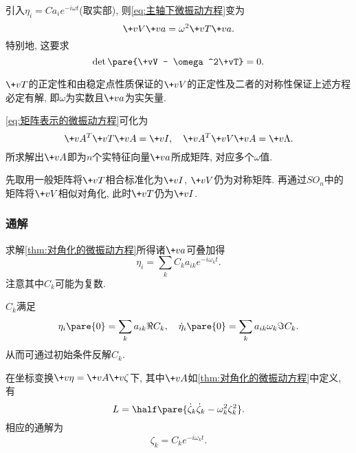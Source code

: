 \documentclass[../TheoreticalMechanics.tex]{subfiles}
\begin{document}
\begin{theorem}[矩阵表示的微振动方程]
    引入$\eta_i = Ca_ie^{-i\omega t}$(取实部), 则\eqref{eq:主轴下微振动方程}变为
    \begin{equation}
        \label{eq:矩阵表示的微振动方程}
         \+vV\+va = \omega^2 \+vT\+va.
    \end{equation}
    特别地, 这要求
    \begin{equation}
        \label{eq:微振动久期方程}
        \det\pare{\+vV - \omega^2\+vT} = 0. 
    \end{equation}
\end{theorem}
\begin{remark}
    $\+vT$的正定性和由稳定点性质保证的$\+vV$的正定性及二者的对称性保证上述方程必定有解, 即$\omega$为实数且$\+va$为实矢量.
\end{remark}
\begin{theorem}[对角化的微振动方程]
    \label{thm:对角化的微振动方程}
    \eqref{eq:矩阵表示的微振动方程}可化为
    \begin{equation}
        \label{eq:对角化的微振动方程}
        \+vA^T\+vT\+vA = \+vI,\quad \+vA^T\+vV\+vA = \+v\Lambda. 
    \end{equation}
    所求解出$\+vA$即为$n$个实特征向量$\+va$所成矩阵, 对应多个$\omega$值.
\end{theorem}
\begin{remark}
    先取用一般矩阵将$\+vT$相合标准化为$\+vI$, $\+vV$仍为对称矩阵. 再通过$SO_n$中的矩阵将$\+vV$相似对角化, 此时$\+vT$仍为$\+vI$.
\end{remark}


\subsubsection{通解} %
\label{ssub:通解}

\begin{finale}
    \begin{theorem}[微振动的通解]
        求解\cref{thm:对角化的微振动方程}所得诸$\+va$可叠加得
        \[ \eta_i = \sum_k C_k a_{ik}e^{-i\omega_k t}. \]
        注意其中$C_k$可能为复数.
    \end{theorem}
\end{finale}
\begin{corollary}[待定系数求解]
    $C_k$满足
    \[ \eta_i\pare{0} = \sum_k a_{ik}\Re C_k,\quad \dot{\eta}_i\pare{0} = \sum_k a_{ik}\omega_k \Im C_k. \]
    从而可通过初始条件反解$C_k$.
\end{corollary}
\begin{finale}
    \begin{corollary}[简正坐标]
        在坐标变换$\+v\eta = \+vA\+v\zeta$下, 其中$\+vA$如\cref{thm:对角化的微振动方程}中定义, 有
        \[ L = \half\pare{\dot{\zeta}_k\dot{\zeta}_k - \omega_k^2\zeta_k^2}. \]
        相应的通解为
        \[ \zeta_k = C_k e^{-i\omega_k t}. \]
    \end{corollary}
\end{finale}
\end{document}

